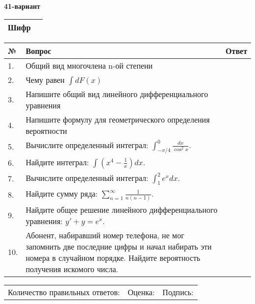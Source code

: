 \documentclass{article}
\begin{document}
  \egroup
  
  \newpage
  
  
  \textbf{41-вариант}\\
  
  \bgroup
  \def\arraystretch{1.6} %
  
  \begin{tabular}{|m{5.7cm}|m{9.5cm}|}
  \hline
  Шифр & \\
  \hline
  \end{tabular}
  
  \vspace{1cm}
  
  \begin{tabular}{|m{0.7cm}|m{10cm}|m{4cm}|}
  \hline
  № & Вопрос & Ответ \\
  \hline
  1. & Общий вид многочлена n-ой степени &  \\
  \hline
  2. & Чему равен \(\int{dF(x)}\) &  \\
  \hline
  3. & Напишите общий вид линейного дифференциального уравнения &  \\
  \hline
  4. & Напишите формулу для геометрического определения вероятности &  \\
  \hline
  5. & Вычислите определенный интеграл: \(\int_{-\pi/4}^{0}\frac{dx}{\cos^2x}\). &  \\
  \hline
  6. & Найдите интеграл: \(\int\left( x^{4} - \frac{1}{x} \right)dx\). &  \\
  \hline
  7. & Вычислите определенный интеграл: \(\int_{1}^{2}{e^{x}dx}\). &  \\
  \hline
  8. & Найдите сумму ряда: \(\sum_{n = 1}^{\infty}\frac{1}{n(n - 1)}\). &  \\
  \hline
  9. & Найдите общее решение линейного дифференциального уравнения: \(y' + y = e^{x}\). &  \\
  \hline
  10. & Абонент, набиравший номер телефона, не мог запомнить две последние цифры и начал набирать эти номера в случайном порядке. Найдите вероятность получения искомого числа. &  \\
  \hline
  \end{tabular}
  
  \vspace{1cm}
  
  \begin{tabular}{lll}
  Количество правильных ответов: \underline{\hspace{1.5cm}} & 
  Оценка: \underline{\hspace{1.5cm}} & 
  Подпись: \underline{\hspace{2cm}} \\
  \end{tabular}
  
\end{document}
